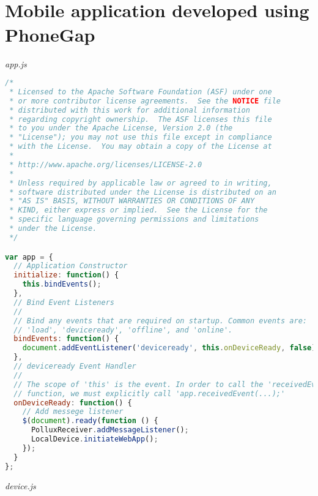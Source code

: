 \section{\\ Mobile application developed using PhoneGap} \label{App:AppendixB}
\emph{app.js}
\begin{lstlisting}[language=JavaScript]
/*
 * Licensed to the Apache Software Foundation (ASF) under one
 * or more contributor license agreements.  See the NOTICE file
 * distributed with this work for additional information
 * regarding copyright ownership.  The ASF licenses this file
 * to you under the Apache License, Version 2.0 (the
 * "License"); you may not use this file except in compliance
 * with the License.  You may obtain a copy of the License at
 *
 * http://www.apache.org/licenses/LICENSE-2.0
 *
 * Unless required by applicable law or agreed to in writing,
 * software distributed under the License is distributed on an
 * "AS IS" BASIS, WITHOUT WARRANTIES OR CONDITIONS OF ANY
 * KIND, either express or implied.  See the License for the
 * specific language governing permissions and limitations
 * under the License.
 */

var app = {
  // Application Constructor
  initialize: function() {
    this.bindEvents();  
  },
  // Bind Event Listeners
  //
  // Bind any events that are required on startup. Common events are:
  // 'load', 'deviceready', 'offline', and 'online'.
  bindEvents: function() {
    document.addEventListener('deviceready', this.onDeviceReady, false);
  },
  // deviceready Event Handler
  //
  // The scope of 'this' is the event. In order to call the 'receivedEvent'
  // function, we must explicitly call 'app.receivedEvent(...);'
  onDeviceReady: function() {
    // Add messege listener
    $(document).ready(function () {
      PolluxReceiver.addMessageListener();
      LocalDevice.initiateWebApp();
    });
  }
};
\end{lstlisting}
\emph{device.js}
